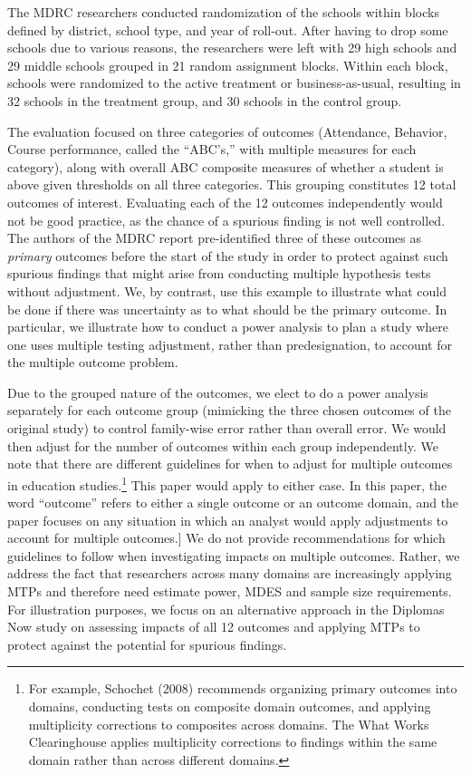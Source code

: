 \documentclass[
]{article}
\begin{document}
The MDRC researchers conducted randomization of the schools within
blocks defined by district, school type, and year of roll-out. After
having to drop some schools due to various reasons, the researchers were
left with 29 high schools and 29 middle schools grouped in 21 random
assignment blocks. Within each block, schools were randomized to the
active treatment or business-as-usual, resulting in 32 schools in the
treatment group, and 30 schools in the control group.

The evaluation focused on three categories of outcomes (Attendance,
Behavior, Course performance, called the ``ABC's,'' with multiple
measures for each category), along with overall ABC composite measures
of whether a student is above given thresholds on all three categories.
This grouping constitutes 12 total outcomes of interest. Evaluating each
of the 12 outcomes independently would not be good practice, as the
chance of a spurious finding is not well controlled. The authors of the
MDRC report pre-identified three of these outcomes as \emph{primary}
outcomes before the start of the study in order to protect against such
spurious findings that might arise from conducting multiple hypothesis
tests without adjustment. We, by contrast, use this example to
illustrate what could be done if there was uncertainty as to what should
be the primary outcome. In particular, we illustrate how to conduct a
power analysis to plan a study where one uses multiple testing
adjustment, rather than predesignation, to account for the multiple
outcome problem.

Due to the grouped nature of the outcomes, we elect to do a power
analysis separately for each outcome group (mimicking the three chosen
outcomes of the original study) to control family-wise error rather than
overall error. We would then adjust for the number of outcomes within
each group independently. We note that there are different guidelines
for when to adjust for multiple outcomes in education
studies.\footnote{For example, Schochet (2008) recommends organizing primary outcomes into domains, conducting tests on composite domain outcomes, and applying multiplicity corrections to composites across domains. The What Works Clearinghouse applies multiplicity corrections to findings within the same domain rather than across different domains.}
This paper would apply to either case. In this paper, the word
``outcome'' refers to either a single outcome or an outcome domain, and
the paper focuses on any situation in which an analyst would apply
adjustments to account for multiple outcomes.{]} We do not provide
recommendations for which guidelines to follow when investigating
impacts on multiple outcomes. Rather, we address the fact that
researchers across many domains are increasingly applying MTPs and
therefore need estimate power, MDES and sample size requirements. For
illustration purposes, we focus on an alternative approach in the
Diplomas Now study on assessing impacts of all 12 outcomes and applying
MTPs to protect against the potential for spurious findings.
\end{document}
